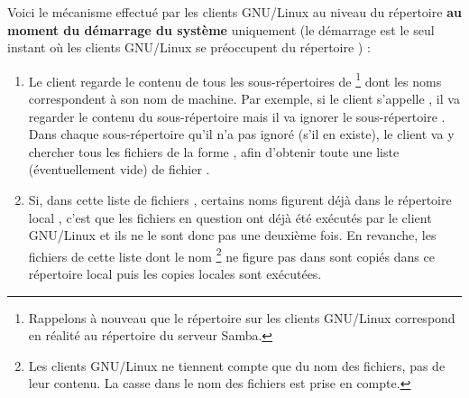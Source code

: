 Voici le mécanisme effectué par les clients GNU/Linux
au niveau du répertoire 
\textbf{au moment du démarrage du système} uniquement (le démarrage
est le seul instant où les clients GNU/Linux se préoccupent du répertoire
) :
%
\begin{enumerate}
\item Le client regarde le contenu de tous les sous-répertoires de
%
%
\footnote{Rappelons à nouveau
que le répertoire  sur les clients GNU/Linux correspond
en réalité au répertoire  du serveur Samba.}
%
dont les noms correspondent à son nom de machine. Par exemple, si le client
s'appelle , il va regarder le contenu du sous-répertoire
 mais il va ignorer le sous-répertoire .
Dans chaque sous-répertoire qu'il n'a pas ignoré (s'il en existe),
le client va y chercher tous les fichiers de la forme ,
afin d'obtenir toute une liste (éventuellement vide) de fichier .


\item Si, dans cette liste de fichiers ,
certains noms figurent déjà dans le répertoire local
, c'est que les fichiers en question ont déjà
été exécutés par le client GNU/Linux et ils ne le sont donc pas une deuxième fois.
En revanche, les fichiers de cette liste dont le nom%
\footnote{Les clients GNU/Linux ne tiennent compte que du nom des
fichiers, pas de leur contenu. La casse dans le nom des fichiers est prise en compte.}
ne figure pas dans
 sont copiés dans ce répertoire local puis
les copies locales sont exécutées.
\end{enumerate}

